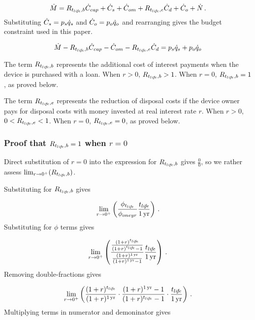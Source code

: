 \begin{equation}
  \dot{M} = R_{t_{li\!f\!e},b} \dot{C}_{cap} + 
             \dot{C}_s + 
             \dot{C}_{om} + 
             R_{t_{li\!f\!e},e} \dot{C}_d + 
             \dot{C}_o + 
             \dot{N} \, .
\end{equation}
%
Substituting $\dot{C}_s = p_s \dot{q}_s$ and 
$\dot{C}_o = p_o \dot{q}_o$ and rearranging gives
the budget constraint used in this paper.

\begin{equation}
  \dot{M} - R_{t_{li\!f\!e},b} \dot{C}_{cap} - \dot{C}_{om} - R_{t_{li\!f\!e},e} \dot{C}_d = p_s \dot{q}_s + p_o \dot{q}_o
\end{equation}

The term $R_{t_{li\!f\!e},b}$ represents the additional cost of interest
payments when the device is purchased with a loan.
When $r > 0$, $R_{t_{li\!f\!e},b} > 1$.
When $r = 0$, $R_{t_{li\!f\!e},b} = 1$, as proved below.

The term $R_{t_{li\!f\!e},e}$ represents the reduction of disposal costs 
if the device owner pays for disposal costs with money
invested at real interest rate $r$. 
When $r > 0$, $0 < R_{t_{li\!f\!e},e} < 1$.
When $r = 0$, $R_{t_{li\!f\!e},e} = 0$, as proved below.


\subsubsection{Proof that $R_{t_{li\!f\!e},b} = 1$ when $r = 0$}

Direct substitution of $r = 0$ into the expression
for $R_{t_{li\!f\!e},b}$ gives $\frac{0}{0}$, 
so we rather assess
$\lim_{r \to 0^+} (R_{t_{li\!f\!e},b})$.

Substituting for $R_{t_{li\!f\!e},b}$ gives

\begin{equation}
  \lim_{r \to 0^+} \left( \frac{\phi_{t_{li\!f\!e}}}{\phi_{oneyr}} \frac{t_{li\!f\!e}}{1\,\mathrm{yr}} \right) \, .
\end{equation}
%
Substituting for $\phi$ terms gives

\begin{equation}
  \lim_{r \to 0^+} \left( \frac{\frac{(1 + r)^{t_{li\!f\!e}}}{(1 + r)^{t_{li\!f\!e}} - 1}}{\frac{(1 + r)^{1\,\mathrm{yr}}}{(1 + r)^{1\,\mathrm{yr}} - 1}} \frac{t_{li\!f\!e}}{1\,\mathrm{yr}} \right) \, .
\end{equation}
%
Removing double-fractions gives

\begin{equation}
  \lim_{r \to 0^+} \left(
  \frac{(1 + r)^{t_{li\!f\!e}}}{(1 + r)^{1\,\mathrm{yr}}} \cdot
  \frac{(1 + r)^{1\,\mathrm{yr}} - 1}{(1 + r)^{t_{li\!f\!e}} - 1} \cdot
  \frac{t_{li\!f\!e}}{1\,\mathrm{yr}}
  \right) \, .
\end{equation}
%
Multiplying terms in numerator and demoninator gives

